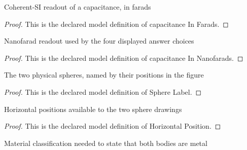 \begin{definition}
  \label{def:physics:phyx-mini-0873:phyxminiproblems-problemphyxmini0873-capacitanceinfarads}
  Coherent-SI readout of a capacitance, in farads
\end{definition}
\begin{proof}
  This is the declared model definition of capacitance In Farads.
\end{proof}
\begin{definition}
  \label{def:physics:phyx-mini-0873:phyxminiproblems-problemphyxmini0873-capacitanceinnanofarads}
  Nanofarad readout used by the four displayed answer choices
\end{definition}
\begin{proof}
  This is the declared model definition of capacitance In Nanofarads.
\end{proof}
\begin{definition}
  \label{def:physics:phyx-mini-0873:phyxminiproblems-problemphyxmini0873-spherelabel}
  The two physical spheres, named by their positions in the figure
\end{definition}
\begin{proof}
  This is the declared model definition of Sphere Label.
\end{proof}
\begin{definition}
  \label{def:physics:phyx-mini-0873:phyxminiproblems-problemphyxmini0873-horizontalposition}
  Horizontal positions available to the two sphere drawings
\end{definition}
\begin{proof}
  This is the declared model definition of Horizontal Position.
\end{proof}
\begin{definition}
  \label{def:physics:phyx-mini-0873:phyxminiproblems-problemphyxmini0873-bodymaterial}
  Material classification needed to state that both bodies are metal
\end{definition}
